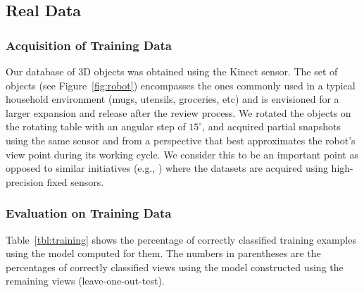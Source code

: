 \documentclass[conference]{sty/IEEEtran}
\begin{document}
\subsection{Real Data}
\subsubsection{Acquisition of Training Data}
Our database of 3D objects was obtained using the Kinect sensor.
The set of objects (see Figure~\ref{fig:robot}) encompasses the ones commonly used
in a typical household environment (mugs, utensils, groceries, etc) and is envisioned for a
larger expansion and release after the review process.  We rotated the objects on the rotating table with
an angular step of $15^\circ$, and acquired partial
snapshots using the same sensor and from a perspective that best
approximates the robot's view point during its working cycle.  We consider
this to be an important point as opposed to similar initiatives (e.g.,
\cite{kit}) where the datasets are acquired using high-precision fixed sensors.




\subsubsection{Evaluation on Training Data}
Table~\ref{tbl:training} shows the percentage of correctly classified training examples using the model computed for them.
The numbers in parentheses are the percentages of correctly classified views using the model constructed using the remaining views
(leave-one-out-test).
\end{document}
